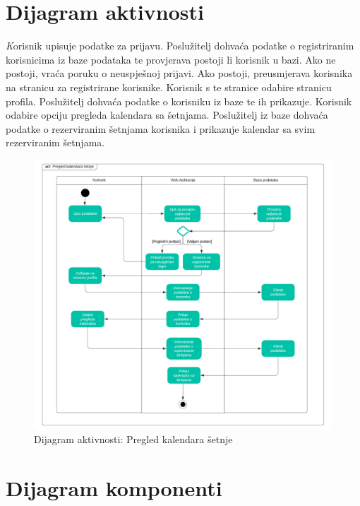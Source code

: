 		\section{Dijagram aktivnosti}
			 \textit
			Korisnik upisuje podatke za prijavu. Poslužitelj dohvaća podatke o registriranim korisnicima iz baze podataka te provjerava postoji li korisnik u bazi. Ako ne postoji, vraća poruku o neuspješnoj prijavi. Ako postoji, preusmjerava korisnika na stranicu za registrirane korisnike. Korisnik s te stranice odabire stranicu profila. Poslužitelj dohvaća podatke o korisniku iz baze te ih prikazuje. Korisnik odabire opciju pregleda kalendara sa šetnjama. Poslužitelj iz baze dohvaća podatke o rezerviranim šetnjama korisnika i prikazuje kalendar sa svim rezerviranim šetnjama.
			\newpage
			\begin{figure}[H]
				\includegraphics[width=1\textwidth]{dijagrami/act.png} %
				\caption{Dijagram aktivnosti: Pregled kalendara šetnje}
				\label{fig:Act1} %
			\end{figure}
		
			\newpage
			\eject
		\section{Dijagram komponenti}
		
